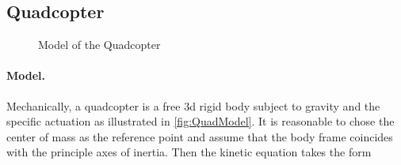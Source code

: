 \subsection{Quadcopter}\label{sec:CtrlExampleQuadcopter}

\begin{figure}[ht]
 \centering
 
 \caption{Model of the Quadcopter}
 \label{fig:QuadModel}
\end{figure}

\paragraph{Model.}
Mechanically, a quadcopter is a free 3d rigid body subject to gravity and the specific actuation as illustrated in \autoref{fig:QuadModel}.
It is reasonable to chose the center of mass as the reference point and assume that the body frame coincides with the principle axes of inertia.
Then the kinetic equation takes the form
